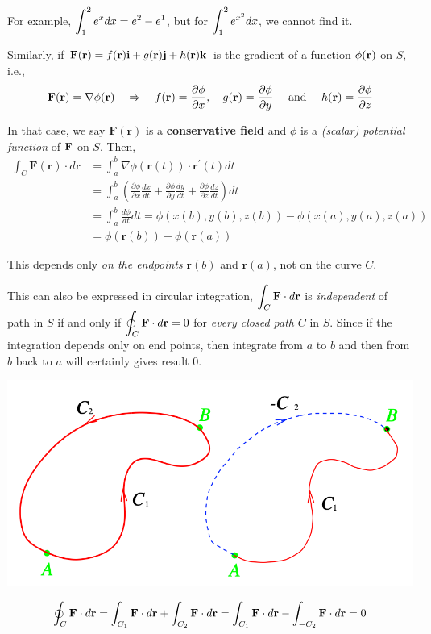 \begin{spacing}{1.3}
    For example, $\displaystyle \int_1^2 e^x dx = e^2-e^1$, but for $\displaystyle \int_1^2 e^{x^2} dx$,
    we cannot find it.

    \vspace{0.3in}
    Similarly, if ${\bf F}({\bf r})=f({\bf r}){\bf i} +g({\bf r}){\bf j} +h({\bf r}){\bf k}$ is the gradient of a function 
    $\phi({\bf r})$ on $S$, i.e.,
    $${\bf F}({\bf r})=\nabla \phi(\mathbf{r}) \quad \Rightarrow \quad 
    f(\mathbf{r})=\frac{\partial \phi}{\partial x}, \quad g(\mathbf{r})=\frac{\partial \phi}{\partial y} \quad 
    \text { and } \quad h(\mathbf{r})=\frac{\partial \phi}{\partial z}$$

    In that case, we say $\mathbf{F}(\mathbf{r})$ is a {\bf conservative field} and $\phi$ is a 
    {\it (scalar) potential function} of ${\bf F}$ on $S$. Then,
    $$\begin{aligned}
    \int_{C} \mathbf{F}(\mathbf{r}) \cdot d \mathbf{r} &=\int_{a}^{b} \nabla \phi(\mathbf{r}(t)) \cdot \mathbf{r}^{\prime}(t) d t \\
    &=\int_{a}^{b}\left(\frac{\partial \phi}{\partial x} \frac{d x}{d t}+\frac{\partial \phi}{\partial y} \frac{d y}{d t}+\frac{\partial \phi}{\partial z} \frac{d z}{d t}\right) d t \\
    &=\int_{a}^{b} \frac{d \phi}{d t} d t=\phi(x(b), y(b), z(b))-\phi(x(a), y(a), z(a)) \\
    &=\phi(\mathbf{r}(b))-\phi(\mathbf{r}(a))
    \end{aligned}$$

    This depends only {\it on the endpoints} $\mathbf{r}(b)$ and $\mathbf{r}(a)$, not on the curve $C.$

    \vspace{0.3in}
    This can also be expressed in circular integration, $\displaystyle \int_C {\bf F}\cdot d{\bf r}$ is {\it independent} of 
    path in $S$ if and only if $\displaystyle \oint_C {\bf F}\cdot d{\bf r} =0$ for {\it every closed path} $C$ in $S$.
    Since if the integration depends only on end points, then integrate from $a$ to $b$ and then from $b$
    back to $a$ will certainly gives result 0.
    \begin{center}
        \includegraphics[scale=0.4]{images/Ch15-circular-integ.png}
    \end{center}
    $$\oint_{C} {\bf F} \cdot d {\bf r} =\int_{C_{1}} {\bf F} \cdot d {\bf r}+\int_{C_{2}} \mathbf{F} \cdot d \mathbf{r} 
    =\int_{C_{1}} \mathbf{F} \cdot d \mathbf{r}-\int_{-C_{2}} \mathbf{F} \cdot d \mathbf{r}=0 $$


\end{spacing}
